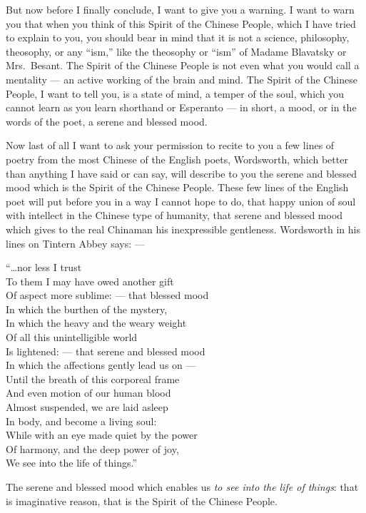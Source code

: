 But now before I finally conclude, I want to give you a warning.
I want to warn you that when you think of this Spirit of the Chinese People, which I have tried to explain to you, you should bear in mind that it is not a science, philosophy, theosophy, or any ``ism,'' like the theosophy or ``ism'' of Madame Blavatsky or Mrs.~Besant.
The Spirit of the Chinese People is not even what you would call a mentality --- an active working of the brain and mind.
The Spirit of the Chinese People, I want to tell you, is a state of mind, a temper of the soul, which you cannot learn as you learn shorthand or Esperanto --- in short, a mood, or in the words of the poet, a serene and blessed mood.

Now last of all I want to ask your permission to recite to you a few lines of poetry from the most Chinese of the English poets, Wordsworth, which better than anything I have said or can say, will describe to you the serene and blessed mood which is the Spirit of the Chinese People.
These few lines of the English poet will put before you in a way I cannot hope to do, that happy union of soul with intellect in the Chinese type of humanity, that serene and blessed mood which gives to the real Chinaman his inexpressible gentleness.
Wordsworth in his lines on Tintern Abbey says: ---
\begin{center}
   ``\dots nor less I trust \\
   To them I may have owed another gift \\
   Of aspect more sublime: --- that blessed mood \\
   In which the burthen of the mystery, \\
   In which the heavy and the weary weight \\
   Of all this unintelligible world \\
   Is lightened: --- that serene and blessed mood \\
   In which the affections gently lead us on --- \\
   Until the breath of this corporeal frame \\
   And even motion of our human blood \\
   Almost suspended, we are laid asleep \\
   In body, and become a living soul: \\
   While with an eye made quiet by the power \\
   Of harmony, and the deep power of joy, \\
   We see into the life of things.''
   \end{center}

   The serene and blessed mood which enables us \emph{to see into the life of things}: that is imaginative reason, that is the Spirit of the Chinese People.
